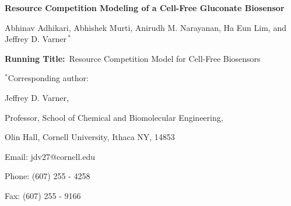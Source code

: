\documentclass[12pt]{article}
\begin{document}
\doublespacing
\begin{titlepage}
{\par\centering\textbf{\Large {Resource Competition Modeling of a Cell-Free Gluconate Biosensor}}}
\vspace{0.05in}
{\par \centering \large{Abhinav Adhikari, Abhishek Murti, Anirudh M. Narayanan, Ha Eun Lim, and Jeffrey D. Varner\,$^{*}$}}
\vspace{0.10in}
{\par {}}
{\par {}}
\vspace{0.1in}
{\par \centering \textbf{Running Title:}~Resource Competition Model for Cell-Free Biosensors}
\vspace{0.1in}
{\par \centering $^{*}$Corresponding author:}
{\par \centering Jeffrey D. Varner,}
{\par \centering Professor, School of Chemical and Biomolecular Engineering,}
{\par {} Olin Hall, Cornell University, Ithaca NY, 14853}
{\par \centering Email: jdv27@cornell.edu}
{\par \centering Phone: (607) 255 - 4258}
{\par \centering Fax: (607) 255 - 9166}
\end{titlepage}
\date{}
\thispagestyle{empty}
\pagebreak
\end{document}
